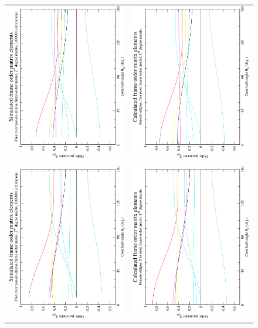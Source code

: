 \begin{figure}
\centering
  \begin{tabular}{@{}cc@{}}
    \includegraphics[width=.35\textwidth,angle=270]{images/frame_order_matrix/Sijkl_pseudo-ellipse_free_rotor_in_frame_theta_x_ens1000000.eps} &
    \includegraphics[width=.35\textwidth,angle=270]{images/frame_order_matrix/Sijkl_pseudo-ellipse_free_rotor_in_frame_theta_x_calc.eps} \\
    \\[-5pt]
    \includegraphics[width=.35\textwidth,angle=270]{images/frame_order_matrix/Sijkl_pseudo-ellipse_free_rotor_in_frame_theta_y_ens1000000.eps} &
    \includegraphics[width=.35\textwidth,angle=270]{images/frame_order_matrix/Sijkl_pseudo-ellipse_free_rotor_in_frame_theta_y_calc.eps} \\

\end{tabular}
\end{figure}
